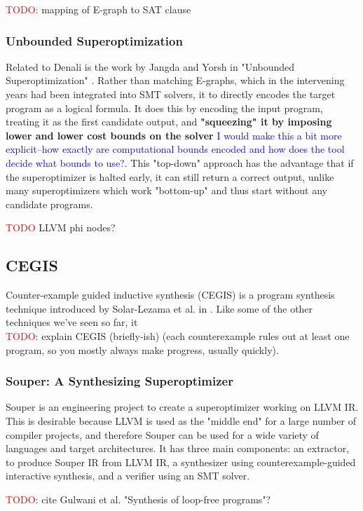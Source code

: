 \documentclass[12pt,twoside]{reedthesis}
\newcommand{\red}[1]{\textcolor{red}{#1}}
\newcommand{\comment}[2]{\textbf{#1} \textcolor{blue}{#2}}
\begin{document}
\red{TODO:} mapping of E-graph to SAT clause

\subsubsection{Unbounded Superoptimization}
Related to Denali is the work by Jangda and Yorsh in "Unbounded Superoptimization" \cite{jangda2017unbounded}.
Rather than matching E-graphs, which in the intervening years had been integrated into SMT solvers, it to directly encodes the target program as a logical formula.
It does this by encoding the input program, treating it as the first candidate output, and
    \comment{"squeezing" it by imposing lower and lower cost bounds on the solver}{I would make this a bit more explicit--how exactly are computational bounds encoded and how does the tool decide what bounds to use?}.
This "top-down" approach has the advantage that if the superoptimizer is halted early, it can still return a correct output, unlike many superoptimizers which work "bottom-up" and thus start without any candidate programs.
    
\red{TODO} LLVM phi nodes?

\subsection{CEGIS}
Counter-example guided inductive synthesis (CEGIS) is a program synthesis technique introduced by Solar-Lezama et al. in \cite{solar-lezama2006sketch}.
Like some of the other techniques we've seen so far, it
\\  \red{TODO}: explain CEGIS (briefly-ish) (each counterexample rules out at least one program, so you mostly always make progress, usually quickly).

\subsubsection{Souper: A Synthesizing Superoptimizer}
Souper \cite{sasnauskas2017souper} is an engineering project to create a superoptimizer working on LLVM IR.
This is desirable because LLVM is used as the "middle end" for a large number of compiler projects, and therefore Souper can be used for a wide variety of languages and target architectures.
It has three main components:
    an extractor, to produce Souper IR from LLVM IR,
    a synthesizer using counterexample-guided interactive synthesis,
    and a verifier using an SMT solver.
    
    \red{TODO}: cite Gulwani et al. "Synthesis of loop-free programs"?
    
\end{document}
